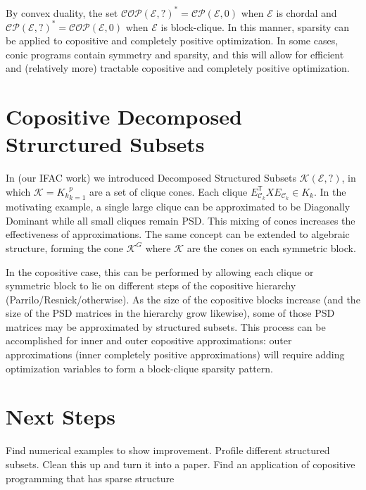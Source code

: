 \documentclass{article}
\newcommand{\tr}{{\mathsf T}}
\newcommand{\es}{\mathcal{E}}
\newcommand{\cs}{\mathcal{C}}
\newcommand{\ks}{\mathcal{K}}
\newcommand{\cp}{\mathcal{C}\mathcal{P}}
\newcommand{\cop}{\mathcal{C}\mathcal{O}\mathcal{P}}
\begin{document}
 By convex duality, the set $\cop(\es, ?)^* = \cp(\es, 0)$ when $\es$ is chordal and $\cp(\es, ?)^* = \cop(\es, 0)$ when $\es$ is block-clique. In this manner, sparsity can be applied to copositive and completely positive optimization. In some cases, conic programs contain symmetry and sparsity, and this will allow for efficient and (relatively more) tractable copositive and completely positive optimization.


\section{Copositive Decomposed Strurctured Subsets}
In (our IFAC work) we introduced Decomposed Structured Subsets $\ks(\es, ?)$, in which $\ks = {K_k}_{k=1}^p$ are a set of clique cones. Each clique $E _{\cs_k}^\tr X E _{\cs_k} \in K_k$. In the motivating example, a single large clique can be approximated to be Diagonally Dominant while all small cliques remain PSD. This mixing of cones increases the effectiveness of approximations. The same concept can be extended to algebraic structure,  forming the cone $\ks^G$ where $\ks$ are the cones on each symmetric block.

In the copositive case, this can be performed by allowing each clique or symmetric block to lie on different steps of the copositive hierarchy (Parrilo/Resnick/otherwise). As the size of the copositive blocks increase (and the size of the PSD matrices in the hierarchy grow likewise), some of those PSD matrices may be approximated by structured subsets. This process can be accomplished for inner and outer copositive approximations: outer approximations (inner completely positive approximations) will require adding optimization variables to form a block-clique sparsity pattern.


\section{Next Steps}
Find numerical examples to show improvement. Profile different structured subsets. Clean this up and turn it into a paper. Find an application of copositive programming that has sparse structure



\medskip


\end{document}
